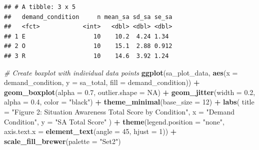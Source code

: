 \documentclass[
]{article}
\newenvironment{Shaded}{\begin{snugshade}}{\end{snugshade}}
\newcommand{\AttributeTok}[1]{\textcolor[rgb]{0.13,0.29,0.53}{#1}}
\newcommand{\CommentTok}[1]{\textcolor[rgb]{0.56,0.35,0.01}{\textit{#1}}}
\newcommand{\ConstantTok}[1]{\textcolor[rgb]{0.56,0.35,0.01}{#1}}
\newcommand{\DecValTok}[1]{\textcolor[rgb]{0.00,0.00,0.81}{#1}}
\newcommand{\FloatTok}[1]{\textcolor[rgb]{0.00,0.00,0.81}{#1}}
\newcommand{\FunctionTok}[1]{\textcolor[rgb]{0.13,0.29,0.53}{\textbf{#1}}}
\newcommand{\NormalTok}[1]{#1}
\newcommand{\SpecialCharTok}[1]{\textcolor[rgb]{0.81,0.36,0.00}{\textbf{#1}}}
\newcommand{\StringTok}[1]{\textcolor[rgb]{0.31,0.60,0.02}{#1}}
\begin{document}
\begin{verbatim}
## # A tibble: 3 x 5
##   demand_condition     n mean_sa sd_sa se_sa
##   <fct>            <int>   <dbl> <dbl> <dbl>
## 1 E                   10    10.2  4.24 1.34 
## 2 O                   10    15.1  2.88 0.912
## 3 R                   10    14.6  3.92 1.24
\end{verbatim}

\begin{Shaded}
\begin{Highlighting}[]
\CommentTok{\# Create boxplot with individual data points}
\FunctionTok{ggplot}\NormalTok{(sa\_plot\_data, }\FunctionTok{aes}\NormalTok{(}\AttributeTok{x =}\NormalTok{ demand\_condition, }\AttributeTok{y =}\NormalTok{ sa\_total, }\AttributeTok{fill =}\NormalTok{ demand\_condition)) }\SpecialCharTok{+}
  \FunctionTok{geom\_boxplot}\NormalTok{(}\AttributeTok{alpha =} \FloatTok{0.7}\NormalTok{, }\AttributeTok{outlier.shape =} \ConstantTok{NA}\NormalTok{) }\SpecialCharTok{+}
  \FunctionTok{geom\_jitter}\NormalTok{(}\AttributeTok{width =} \FloatTok{0.2}\NormalTok{, }\AttributeTok{alpha =} \FloatTok{0.4}\NormalTok{, }\AttributeTok{color =} \StringTok{"black"}\NormalTok{) }\SpecialCharTok{+}
  \FunctionTok{theme\_minimal}\NormalTok{(}\AttributeTok{base\_size =} \DecValTok{12}\NormalTok{) }\SpecialCharTok{+}
  \FunctionTok{labs}\NormalTok{(}
    \AttributeTok{title =} \StringTok{"Figure 2: Situation Awareness Total Score by Condition"}\NormalTok{,}
    \AttributeTok{x =} \StringTok{"Demand Condition"}\NormalTok{,}
    \AttributeTok{y =} \StringTok{"SA Total Score"}
\NormalTok{  ) }\SpecialCharTok{+}
  \FunctionTok{theme}\NormalTok{(}\AttributeTok{legend.position =} \StringTok{"none"}\NormalTok{,}
        \AttributeTok{axis.text.x =} \FunctionTok{element\_text}\NormalTok{(}\AttributeTok{angle =} \DecValTok{45}\NormalTok{, }\AttributeTok{hjust =} \DecValTok{1}\NormalTok{)) }\SpecialCharTok{+}
  \FunctionTok{scale\_fill\_brewer}\NormalTok{(}\AttributeTok{palette =} \StringTok{"Set2"}\NormalTok{)}
\end{Highlighting}
\end{Shaded}
\end{document}
